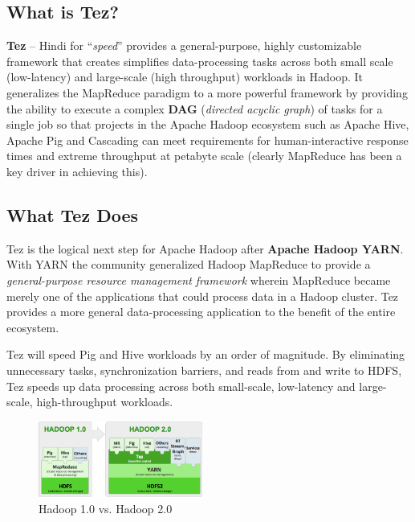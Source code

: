 \documentclass[twocolumn]{article}
\begin{document}
\subsection{What is Tez?}

\textbf{Tez} -- Hindi for ``\emph{speed}'' provides a general-purpose, highly customizable
framework that creates simplifies data-processing tasks across both
small scale (low-latency) and large-scale (high throughput) workloads in
Hadoop. It generalizes the MapReduce paradigm to a more powerful
framework by providing the ability to execute a complex \textbf{DAG}
(\emph{directed acyclic graph}) of tasks for a single job so that
projects in the Apache Hadoop ecosystem such as Apache Hive, Apache Pig
and Cascading can meet requirements for human-interactive response times
and extreme throughput at petabyte scale (clearly MapReduce has been a
key driver in achieving this).

\subsection{What Tez Does}

Tez is the logical next step for Apache Hadoop after \textbf{Apache
Hadoop YARN}. With YARN the community generalized Hadoop MapReduce to
provide a \emph{general-purpose resource management framework} wherein
MapReduce became merely one of the applications that could process data
in a Hadoop cluster. Tez provides a more general data-processing
application to the benefit of the entire ecosystem.

Tez will speed Pig and Hive workloads by an order of magnitude. By
eliminating unnecessary tasks, synchronization barriers, and reads from
and write to HDFS, Tez speeds up data processing across both
small-scale, low-latency and large-scale, high-throughput workloads.

\begin{figure}[!t]
        \centering
        \includegraphics[width=0.48\textwidth]{hadoopstack}
        \caption{Hadoop 1.0 vs. Hadoop 2.0}
        \label{fig01}
\end{figure}
\end{document}
